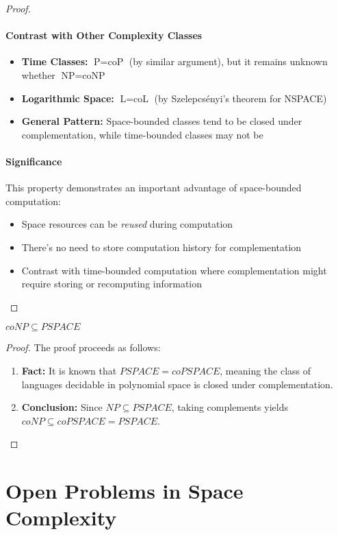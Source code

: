 \begin{proof}
\paragraph{Contrast with Other Complexity Classes}
\begin{itemize}
    \item \textbf{Time Classes:} $\text{P} = \text{coP}$ (by similar argument), but it remains unknown whether $\text{NP} = \text{coNP}$
    \item \textbf{Logarithmic Space:} $\text{L} = \text{coL}$ (by Szelepcsényi's theorem for NSPACE)
    \item \textbf{General Pattern:} Space-bounded classes tend to be closed under complementation, while time-bounded classes may not be
\end{itemize}

\paragraph{Significance}
This property demonstrates an important advantage of space-bounded computation:
\begin{itemize}
    \item Space resources can be \textit{reused} during computation
    \item There's no need to store computation history for complementation
    \item Contrast with time-bounded computation where complementation might require storing or recomputing information
\end{itemize}
\end{proof}

\begin{theorem}
    $coNP \subseteq PSPACE$
\end{theorem}

\begin{proof}
The proof proceeds as follows:
\begin{enumerate}
    \item \textbf{Fact:} It is known that $PSPACE = coPSPACE$, meaning the class of languages decidable in polynomial space is closed under 
    complementation.

    \item \textbf{Conclusion:}  
    Since $NP \subseteq PSPACE$, taking complements yields $coNP \subseteq coPSPACE = PSPACE$.
\end{enumerate}
\end{proof}

\section{Open Problems in Space Complexity}


